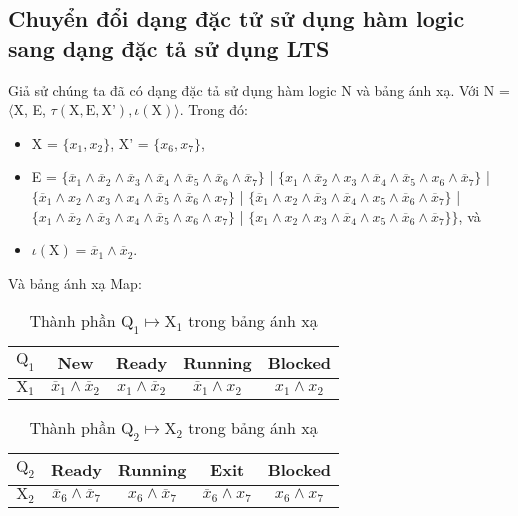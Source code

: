 \documentclass[a4paper,13pt,oneside,openany]{book}
\begin{document}
\begin{flushleft}
	\section{Chuyển đổi dạng đặc tử sử dụng hàm logic sang dạng đặc tả sử dụng LTS}
	Giả sử chúng ta đã có dạng đặc tả sử dụng hàm logic N và bảng ánh xạ. Với N = $\langle$X, E, $\tau(\textrm{X}, \textrm{E}, \textrm{X'}), \iota(\textrm{X})\rangle$. Trong đó:
	\begin{itemize}
		\item X = $\{x_1, x_2\}$, X' = $\{x_6, x_7\}$,
		\item E = $\{\overline{x}_1 \land \overline{x}_2 \land \overline{x}_3 \land \overline{x}_4 \land \overline{x}_5 \land \overline{x}_6 \land \overline{x}_7\}$ | $\{x_1 \land \overline{x}_2 \land x_3 \land \overline{x}_4 \land \overline{x}_5 \land x_6 \land \overline{x}_7\}$ | $\{\overline{x}_1 \land x_2 \land x_3 \land x_4 \land \overline{x}_5 \land \overline{x}_6 \land x_7\}$ | $\{\overline{x}_1 \land x_2 \land \overline{x}_3 \land \overline{x}_4 \land x_5 \land \overline{x}_6 \land \overline{x}_7\}$ | $\{x_1 \land \overline{x}_2 \land \overline{x}_3 \land x_4 \land \overline{x}_5 \land x_6 \land x_7\}$ | $\{x_1 \land x_2 \land x_3 \land \overline{x}_4 \land x_5 \land \overline{x}_6 \land \overline{x}_7\}\}$, và
		\item $\iota(\textrm{X}) = \overline{x}_1 \land \overline{x}_2$.
	\end{itemize}
	Và bảng ánh xạ Map:
	\begin{table}[!ht]
		\centering
		\renewcommand{\arraystretch}{1.25}
		\begin{tabular}{|c|c|c|c|c|}
			\hline
			$\textrm{Q}_1$ & New & Ready & Running & Blocked\\
			\hline
			$\textrm{X}_1$ & $\overline{x}_1 \land \overline{x}_2$ & $x_1\land\overline{x}_2$&$\overline{x}_1\land x_2$ &
			$x_1 \land x_2$\\
			\hline
		\end{tabular}
		\caption{Thành phần $\textrm{Q}_1 \mapsto \textrm{X}_1$ trong bảng ánh xạ}
	\end{table}

	\begin{table}[!ht]
		\centering
		\renewcommand{\arraystretch}{1.25}
		\begin{tabular}{|c|c|c|c|c|}
			\hline
			$\textrm{Q}_2$ & Ready & Running & Exit & Blocked\\
			\hline
			$\textrm{X}_2$ & $\overline{x}_6 \land \overline{x}_7$ & $x_6\land \overline{x}_7$ & $\overline{x}_6\land x_7$ &
			$x_6 \land x_7$\\
			\hline
		\end{tabular}
		\caption{Thành phần $\textrm{Q}_2 \mapsto \textrm{X}_2$ trong bảng ánh xạ}
	\end{table}


\end{flushleft}
\end{document}
